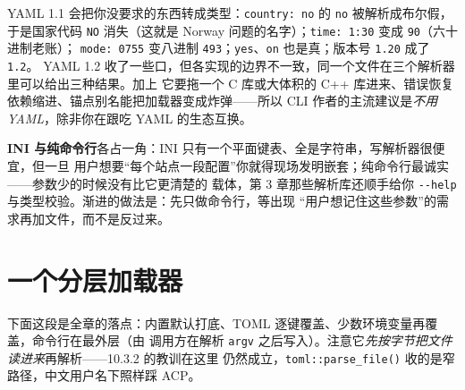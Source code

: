 \documentclass[12pt,a4paper,fontset=fandol]{ctexbook}
\newcommand{\Fn}[1]{\texttt{#1()}}
\newcommand{\Tp}[1]{\texttt{#1}}
\newcommand{\Opt}[1]{\texttt{-\/-#1}}
\begin{document}
\begin{note}[title={YAML 的 Norway 问题与它的同类}]
YAML 1.1 会把你没要求的东西转成类型：\Tp{country: no} 的 \Tp{no} 被解析成布尔假，于是国家代码
\Tp{NO} 消失（这就是 Norway 问题的名字）；\Tp{time: 1:30} 变成 \Tp{90}（六十进制老账）；
\Tp{mode: 0755} 变八进制 \Tp{493}；\Tp{yes}、\Tp{on} 也是真；版本号 \Tp{1.20} 成了 \Tp{1.2}。
YAML 1.2 收了一些口，但各实现的边界不一致，同一个文件在三个解析器里可以给出三种结果。加上
它要拖一个 C 库或大体积的 C++ 库进来、错误恢复依赖缩进、锚点别名能把加载器变成炸弹——所以
CLI 作者的主流建议是\emph{不用 YAML}，除非你在跟吃 YAML 的生态互换。
\end{note}

\textbf{INI 与纯命令行}各占一角：INI 只有一个平面键表、全是字符串，写解析器很便宜，但一旦
用户想要``每个站点一段配置''你就得现场发明嵌套；纯命令行最诚实——参数少的时候没有比它更清楚的
载体，第 3 章那些解析库还顺手给你 \Opt{help} 与类型校验。渐进的做法是：先只做命令行，等出现
``用户想记住这些参数''的需求再加文件，而不是反过来。

\section{一个分层加载器}

下面这段是全章的落点：内置默认打底、TOML 逐键覆盖、少数环境变量再覆盖，命令行在最外层（由
调用方在解析 \Tp{argv} 之后写入）。注意它\emph{先按字节把文件读进来}再解析——10.3.2 的教训在这里
仍然成立，\Fn{toml::parse\_file} 收的是窄路径，中文用户名下照样踩 ACP。
\end{document}
